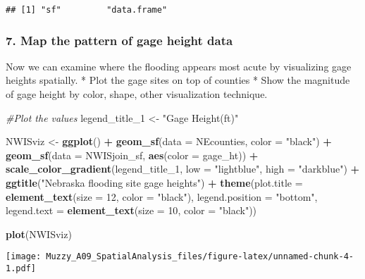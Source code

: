 \documentclass[]{article}
\newenvironment{Shaded}{\begin{snugshade}}{\end{snugshade}}
\newcommand{\KeywordTok}[1]{\textcolor[rgb]{0.13,0.29,0.53}{\textbf{#1}}}
\newcommand{\DataTypeTok}[1]{\textcolor[rgb]{0.13,0.29,0.53}{#1}}
\newcommand{\DecValTok}[1]{\textcolor[rgb]{0.00,0.00,0.81}{#1}}
\newcommand{\StringTok}[1]{\textcolor[rgb]{0.31,0.60,0.02}{#1}}
\newcommand{\CommentTok}[1]{\textcolor[rgb]{0.56,0.35,0.01}{\textit{#1}}}
\newcommand{\OperatorTok}[1]{\textcolor[rgb]{0.81,0.36,0.00}{\textbf{#1}}}
\newcommand{\NormalTok}[1]{#1}
\begin{document}
\begin{verbatim}
## [1] "sf"         "data.frame"
\end{verbatim}

\subsubsection{7. Map the pattern of gage height
data}\label{map-the-pattern-of-gage-height-data}

Now we can examine where the flooding appears most acute by visualizing
gage heights spatially. * Plot the gage sites on top of counties * Show
the magnitude of gage height by color, shape, other visualization
technique.

\begin{Shaded}
\begin{Highlighting}[]
\CommentTok{#Plot the values}
\NormalTok{legend_title_}\DecValTok{1}\NormalTok{ <-}\StringTok{ "Gage Height(ft)"}

\NormalTok{NWISviz <-}\StringTok{ }\KeywordTok{ggplot}\NormalTok{() }\OperatorTok{+}
\StringTok{  }\KeywordTok{geom_sf}\NormalTok{(}\DataTypeTok{data =}\NormalTok{ NEcounties, }\DataTypeTok{color =} \StringTok{"black"}\NormalTok{) }\OperatorTok{+}
\StringTok{  }\KeywordTok{geom_sf}\NormalTok{(}\DataTypeTok{data =}\NormalTok{ NWISjoin_sf, }\KeywordTok{aes}\NormalTok{(}\DataTypeTok{color =}\NormalTok{ gage_ht)) }\OperatorTok{+}
\StringTok{  }\KeywordTok{scale_color_gradient}\NormalTok{(legend_title_}\DecValTok{1}\NormalTok{, }\DataTypeTok{low =} \StringTok{"lightblue"}\NormalTok{, }\DataTypeTok{high =} \StringTok{"darkblue"}\NormalTok{) }\OperatorTok{+}
\StringTok{  }\KeywordTok{ggtitle}\NormalTok{(}\StringTok{"Nebraska flooding site gage heights"}\NormalTok{) }\OperatorTok{+}
\StringTok{  }\KeywordTok{theme}\NormalTok{(}\DataTypeTok{plot.title =} \KeywordTok{element_text}\NormalTok{(}\DataTypeTok{size =} \DecValTok{12}\NormalTok{, }\DataTypeTok{color =} \StringTok{"black"}\NormalTok{),}
        \DataTypeTok{legend.position =} \StringTok{"bottom"}\NormalTok{,}
        \DataTypeTok{legend.text =} \KeywordTok{element_text}\NormalTok{(}\DataTypeTok{size =} \DecValTok{10}\NormalTok{, }\DataTypeTok{color =} \StringTok{"black"}\NormalTok{))}
 
\KeywordTok{plot}\NormalTok{(NWISviz)}
\end{Highlighting}
\end{Shaded}

\texttt{[image: Muzzy\_A09\_SpatialAnalysis\_files/figure-latex/unnamed-chunk-4-1.pdf]}
\end{document}
